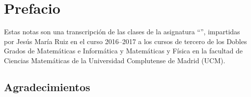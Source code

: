 \section*{Prefacio}
\label{pref}
Estas notas son una transcripción de las clases de la asignatura ``'', impartidas por Jesús María Ruiz en el curso 2016--2017 a los cursos de tercero de los Dobles Grados de Matemáticas e Informática y Matemáticas y Física en la facultad de Ciencias Matemáticas de la Universidad Complutense de Madrid (UCM).

\subsection*{Agradecimientos}